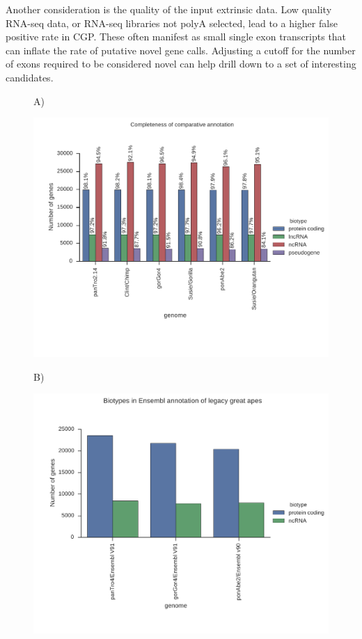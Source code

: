 \documentclass[fleqn,10pt]{wlscirep}
\begin{document}
Another consideration is the quality of the input extrinsic data. Low quality RNA-seq data, or RNA-seq libraries not polyA selected, lead to a higher false positive rate in CGP. These often manifest as small single exon transcripts that can inflate the rate of putative novel gene calls. Adjusting a cutoff for the number of exons required to be considered novel can help drill down to a set of interesting candidates.

\clearpage

\begin{figure}
\centering

A)

\includegraphics[scale=0.7]{primate_completeness_old_and_new.pdf}

B)

\includegraphics[scale=0.5]{ensembl_primate_biotypes.pdf}


\end{figure}
\end{document}
